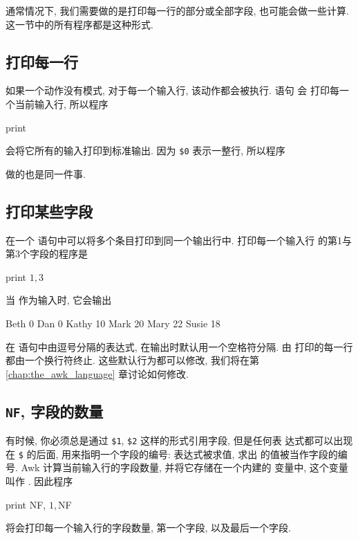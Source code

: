 通常情况下, 我们需要做的是打印每一行的部分或全部字段, 也可能会做一些计算.
这一节中的所有程序都是这种形式.

\subsection{打印每一行}
\label{subsec:printing_every_line}

如果一个动作没有模式, 对于每一个输入行, 该动作都会被执行. 语句 \print 会
打印每一个当前输入行, 所以程序
\begin{awkcode}
    { print }
\end{awkcode}
会将它所有的输入打印到标准输出. 因为 \verb'$0' 表示一整行, 所以程序
做的也是同一件事.

\subsection{打印某些字段}
\label{subsec:printing_certain_fields}

在一个 \print 语句中可以将多个条目打印到同一个输出行中. 打印每一个输入行
的第1与第3个字段的程序是
\begin{awkcode}
    { print $1, $3 }
\end{awkcode}
当  作为输入时, 它会输出
\begin{file}
    Beth 0
    Dan 0
    Kathy 10
    Mark 20
    Mary 22
    Susie 18
\end{file}
在 \print 语句中由逗号分隔的表达式, 在输出时默认用一个空格符分隔. 由
\print 打印的每一行都由一个换行符终止. 这些默认行为都可以修改, 我们将在第
\ref{chap:the_awk_language} 章讨论如何修改.

\subsection{\texttt{NF}, 字段的数量}
\label{subsec:nf_the_number_fields}

有时候, 你必须总是通过 \verb'$1', \verb'$2' 这样的形式引用字段, 但是任何表
达式都可以出现在 \verb'$' 的后面, 用来指明一个字段的编号: 表达式被求值, 求出
的值被当作字段的编号. Awk 计算当前输入行的字段数量, 并将它存储在一个内建的
变量中, 这个变量叫作 \nf. 因此程序
\begin{awkcode}
    { print NF, $1, $NF }
\end{awkcode}
将会打印每一个输入行的字段数量, 第一个字段, 以及最后一个字段.

